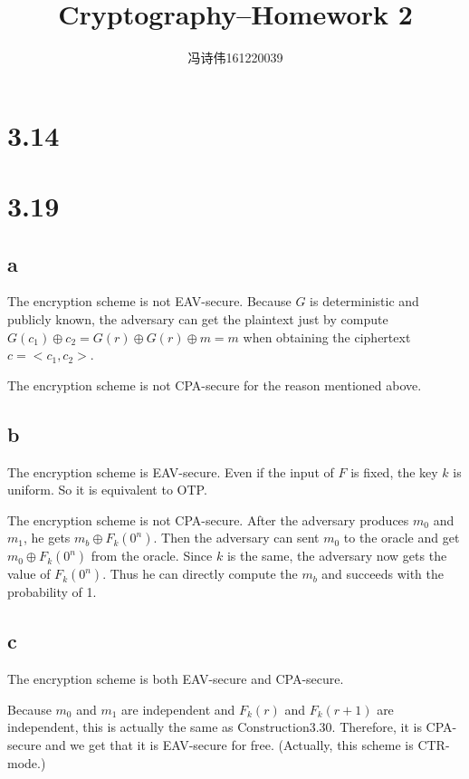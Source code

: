 \documentclass[a4papers]{ctexart}
\title{Cryptography--Homework 2}
\author{冯诗伟161220039}
\date{}
\begin{document}
\maketitle
\section*{3.14}


\section*{3.19}
\subsection*{a}
The encryption scheme is not EAV-secure. Because $G$ is deterministic and publicly known, the adversary can get the plaintext
just by compute $G(c_1)\oplus c_2 = G(r) \oplus G(r) \oplus m = m$ when obtaining the ciphertext $c=<c_1,c_2>$.

The encryption scheme is not CPA-secure for the reason mentioned above.

\subsection*{b}
The encryption scheme is EAV-secure. Even if the input of $F$ is fixed, the key $k$ is uniform. So it is equivalent to OTP.

The encryption scheme is not CPA-secure. After the adversary produces $m_0$ and $m_1$, he gets $m_b \oplus F_k(0^n)$. Then the adversary 
can sent $m_0$ to the oracle and get $m_0 \oplus F_k(0^n)$ from the oracle. Since $k$ is the same, the adversary now gets the value of $F_k(0^n)$. 
Thus he can directly compute the $m_b$ and succeeds with the probability of 1.

\subsection*{c}
The encryption scheme is both EAV-secure and CPA-secure.

Because $m_0$ and $m_1$ are independent and $F_k(r)$ and $F_k(r+1)$ are independent, this is actually the same as Construction3.30. 
Therefore, it is CPA-secure and we get that it is EAV-secure for free. (Actually, this scheme is CTR-mode.)
\end{document}
